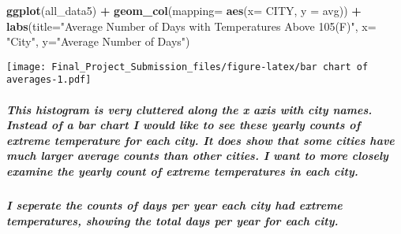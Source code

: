 \documentclass[]{article}
\newenvironment{Shaded}{\begin{snugshade}}{\end{snugshade}}
\newcommand{\DataTypeTok}[1]{\textcolor[rgb]{0.13,0.29,0.53}{#1}}
\newcommand{\KeywordTok}[1]{\textcolor[rgb]{0.13,0.29,0.53}{\textbf{#1}}}
\newcommand{\NormalTok}[1]{#1}
\newcommand{\OperatorTok}[1]{\textcolor[rgb]{0.81,0.36,0.00}{\textbf{#1}}}
\newcommand{\StringTok}[1]{\textcolor[rgb]{0.31,0.60,0.02}{#1}}
\let\oldsubparagraph\subparagraph
\renewcommand{\subparagraph}[1]{\oldsubparagraph{#1}\mbox{}}
\begin{document}
\begin{Shaded}
\begin{Highlighting}[]
\KeywordTok{ggplot}\NormalTok{(all_data5) }\OperatorTok{+}
\StringTok{  }\KeywordTok{geom_col}\NormalTok{(}\DataTypeTok{mapping=} \KeywordTok{aes}\NormalTok{(}\DataTypeTok{x=}\NormalTok{ CITY, }\DataTypeTok{y =}\NormalTok{ avg)) }\OperatorTok{+}
\StringTok{  }\KeywordTok{labs}\NormalTok{(}\DataTypeTok{title=}\StringTok{"Average Number of Days with Temperatures Above 105(F)"}\NormalTok{, }\DataTypeTok{x=} \StringTok{"City"}\NormalTok{, }\DataTypeTok{y=}\StringTok{"Average Number of Days"}\NormalTok{)}
\end{Highlighting}
\end{Shaded}

\texttt{[image: Final\_Project\_Submission\_files/figure-latex/bar chart of averages-1.pdf]}

\hypertarget{this-histogram-is-very-cluttered-along-the-x-axis-with-city-names.-instead-of-a-bar-chart-i-would-like-to-see-these-yearly-counts-of-extreme-temperature-for-each-city.-it-does-show-that-some-cities-have-much-larger-average-counts-than-other-cities.-i-want-to-more-closely-examine-the-yearly-count-of-extreme-temperatures-in-each-city.}{%
\subparagraph{This histogram is very cluttered along the x axis with
city names. Instead of a bar chart I would like to see these yearly
counts of extreme temperature for each city. It does show that some
cities have much larger average counts than other cities. I want to more
closely examine the yearly count of extreme temperatures in each
city.}\label{this-histogram-is-very-cluttered-along-the-x-axis-with-city-names.-instead-of-a-bar-chart-i-would-like-to-see-these-yearly-counts-of-extreme-temperature-for-each-city.-it-does-show-that-some-cities-have-much-larger-average-counts-than-other-cities.-i-want-to-more-closely-examine-the-yearly-count-of-extreme-temperatures-in-each-city.}}

\hypertarget{i-seperate-the-counts-of-days-per-year-each-city-had-extreme-temperatures-showing-the-total-days-per-year-for-each-city.}{%
\subparagraph{I seperate the counts of days per year each city had
extreme temperatures, showing the total days per year for each
city.}\label{i-seperate-the-counts-of-days-per-year-each-city-had-extreme-temperatures-showing-the-total-days-per-year-for-each-city.}}
\end{document}
